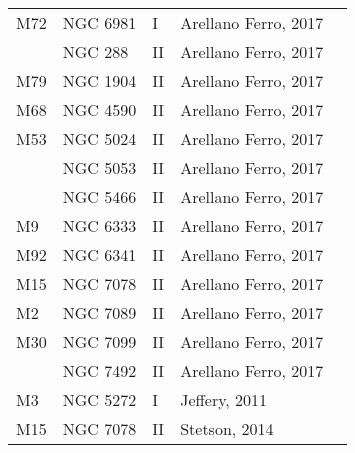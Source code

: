 \documentclass[]{article}
\begin{document}
\begin{longtable}{
	p{1.5cm}|
	p{2.5cm}|
	p{2.5cm}|
	p{3.7cm}|
	p{5.5cm}
	@{}}
		M72            & NGC 6981     & I          & Arellano Ferro, 2017 &                                                                        \\
		& NGC 288      & II         & Arellano Ferro, 2017 &                                                                        \\
		M79            & NGC 1904     & II         & Arellano Ferro, 2017 &                                                                        \\
		M68            & NGC 4590     & II         & Arellano Ferro, 2017 &                                                                        \\
		M53            & NGC 5024     & II         & Arellano Ferro, 2017 &                                                                        \\
		& NGC 5053     & II         & Arellano Ferro, 2017 &                                                                        \\
		& NGC 5466     & II         & Arellano Ferro, 2017 &                                                                        \\
		M9             & NGC 6333     & II         & Arellano Ferro, 2017 &                                                                        \\
		M92            & NGC 6341     & II         & Arellano Ferro, 2017 &                                                                        \\
		M15            & NGC 7078     & II         & Arellano Ferro, 2017 &                                                                        \\
		M2             & NGC 7089     & II         & Arellano Ferro, 2017 &                                                                        \\
		M30            & NGC 7099     & II         & Arellano Ferro, 2017 &                                                                        \\
		& NGC 7492     & II         & Arellano Ferro, 2017 &                                                                        \\
		M3             & NGC 5272     & I          & Jeffery, 2011 \cite{jeffery_2011}        &                                                                        \\
		M15            & NGC 7078     & II         & Stetson, 2014 \cite{stetson_2014}        &                                                                        \\

\end{longtable}
\end{document}

